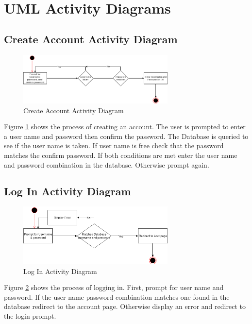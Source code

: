 \section{UML Activity Diagrams}

\subsection{Create Account Activity Diagram}

\begin{figure}[h]
  \centering
  \includegraphics[width=0.7\textwidth]{images/Create_Account_Activity_Diagram.png}
  \caption{Create Account Activity Diagram}
  \label{fig:createAccount}
\end{figure}

Figure \ref{fig:createAccount} shows the process of creating an account. The user is prompted to enter a user name and password then confirm the password. The Database is queried to see if the user name is taken. If user name is free check that the password matches the confirm password. If both conditions are met enter the user name and password combination in the database. Otherwise prompt again.

\subsection{Log In Activity Diagram}

\begin{figure}[h]
  \centering
  \includegraphics[width=0.7\textwidth]{images/Log_In_Activity_Diagram.png}
  \caption{Log In Activity Diagram}
  \label{fig:logIn}
\end{figure}

Figure \ref{fig:logIn} shows the process of logging in. First, prompt for user name and password. If the user name password combination matches one found in the database redirect to the account page. Otherwise display an error and redirect to the login prompt.

